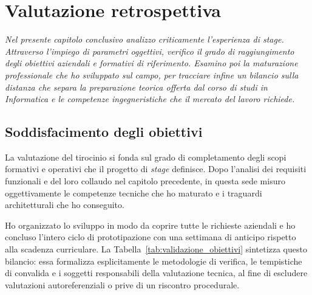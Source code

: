 \chapter{Valutazione retrospettiva}
\label{chap:conclusioni}

\textit{Nel presente capitolo conclusivo analizzo criticamente l'esperienza di \emph{stage}. Attraverso l'impiego di parametri oggettivi, verifico il grado di raggiungimento degli obiettivi aziendali e formativi di riferimento. Esamino poi la maturazione professionale che ho sviluppato sul campo, per tracciare infine un bilancio sulla distanza che separa la preparazione teorica offerta dal corso di studi in Informatica e le competenze ingegneristiche che il mercato del lavoro richiede.}

\section{Soddisfacimento degli obiettivi}
\label{sec:obiettivi_raggiunti}

La valutazione del tirocinio si fonda sul grado di completamento degli scopi formativi e operativi che il progetto di \textit{stage} definisce. Dopo l'analisi dei requisiti funzionali e del loro collaudo nel capitolo precedente, in questa sede misuro oggettivamente le competenze tecniche che ho maturato e i traguardi architetturali che ho conseguito.

Ho organizzato lo sviluppo in modo da coprire tutte le richieste aziendali e ho concluso l'intero ciclo di prototipazione con una settimana di anticipo rispetto alla scadenza curriculare. La Tabella~\ref{tab:validazione_obiettivi} sintetizza questo bilancio: essa formalizza esplicitamente le metodologie di verifica, le tempistiche di convalida e i soggetti responsabili della valutazione tecnica, al fine di escludere valutazioni autoreferenziali o prive di un riscontro procedurale.

